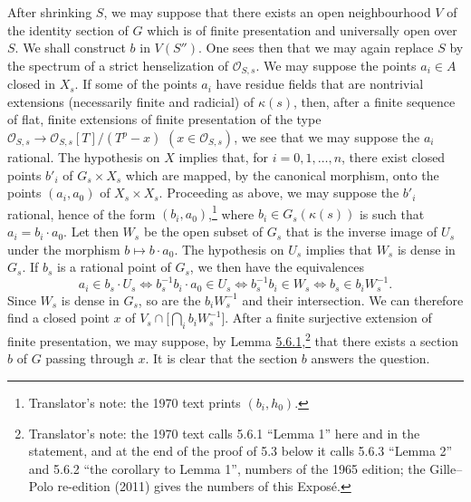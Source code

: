 After shrinking \(S\), we may suppose that there exists an open neighbourhood \(V\) of the identity section of
\(G\) which is of finite presentation and universally open over \(S\). We shall construct \(b\) in \(V(S'')\). One
sees then that we may again replace \(S\) by the spectrum of a strict henselization of \(\mathcal O_{S,s}\). We
may suppose the points \(a_i\in A\) closed in \(X_s\). If some of the points \(a_i\) have residue fields that are
nontrivial extensions (necessarily finite and radicial) of \(\kappa(s)\), then, after a finite sequence of flat,
finite extensions of finite presentation of the type \(\mathcal O_{S,s}\to\mathcal O_{S,s}[T]/(T^p-x)\)
\((x\in\mathcal O_{S,s})\), we see that we may suppose the \(a_i\) rational. The hypothesis on \(X\) implies that,
for \(i=0,1,\ldots,n\), there exist closed points \(b'_i\) of \(G_s\times X_s\) which are mapped, by the canonical
morphism, onto the points \((a_i,a_0)\) of \(X_s\times X_s\). Proceeding as above, we may suppose the \(b'_i\)
rational, hence of the form \((b_i,a_0)\),\footnote{Translator's note: the 1970 text prints \((b_i,h_0)\).} where
\(b_i\in G_s(\kappa(s))\) is such that \(a_i=b_i\cdot a_0\). Let then \(W_s\) be the open subset of \(G_s\) that
is the inverse image of \(U_s\) under the morphism \(b\mapsto b\cdot a_0\). The hypothesis on \(U_s\) implies that
\(W_s\) is dense in \(G_s\). If \(b_s\) is a rational point of \(G_s\), we then have the equivalences
\[
  a_i\in b_s\cdot U_s\iff b_s^{-1}b_i\cdot a_0\in U_s\iff b_s^{-1}b_i\in W_s\iff b_s\in b_iW_s^{-1}.
\]
Since \(W_s\) is dense in \(G_s\), so are the \(b_iW_s^{-1}\) and their intersection. We can therefore find a
closed point \(x\) of \(V_s\cap\bigl[\bigcap_ib_iW_s^{-1}\bigr]\). After a finite surjective extension of finite
presentation, we may suppose, by Lemma \hyperref[lem:sga3-VIB-5.6.1]{5.6.1},\footnote{Translator's note: the
1970 text calls 5.6.1 ``Lemma 1'' here and in the statement, and at the end of the proof of 5.3 below it calls
5.6.3 ``Lemma 2'' and 5.6.2 ``the corollary to Lemma 1'', numbers of the 1965 edition; the Gille--Polo
re-edition (2011) gives the numbers of this Expos\'e.} that there exists a section \(b\) of \(G\) passing through
\(x\). It is clear that the section \(b\) answers the question.

